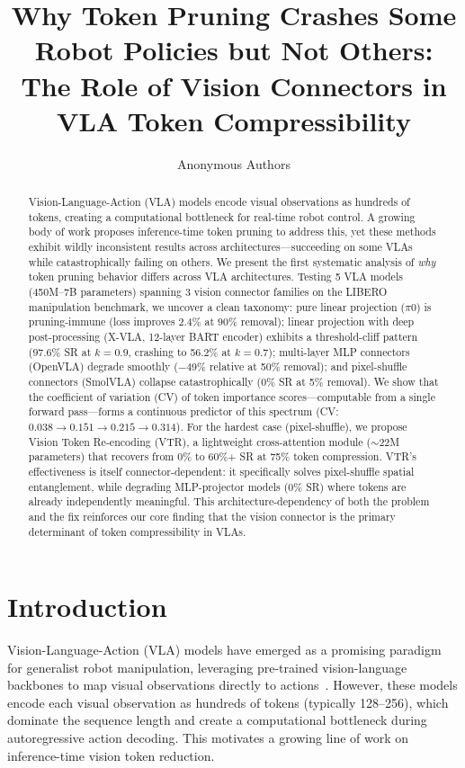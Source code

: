 \documentclass[letterpaper]{article}
\title{Why Token Pruning Crashes Some Robot Policies but Not Others:\\The Role of Vision Connectors in VLA Token Compressibility}
\author[1]{Anonymous Authors}
\affil[1]{Anonymous Institution}
\date{}
\begin{document}
\maketitle

\begin{abstract}
Vision-Language-Action (VLA) models encode visual observations as hundreds of tokens, creating a computational bottleneck for real-time robot control. A growing body of work proposes inference-time token pruning to address this, yet these methods exhibit wildly inconsistent results across architectures---succeeding on some VLAs while catastrophically failing on others. We present the first systematic analysis of \emph{why} token pruning behavior differs across VLA architectures. Testing 5 VLA models (450M--7B parameters) spanning 3 vision connector families on the LIBERO manipulation benchmark, we uncover a clean taxonomy: pure linear projection ($\pi$0) is pruning-immune (loss improves 2.4\% at 90\% removal); linear projection with deep post-processing (X-VLA, 12-layer BART encoder) exhibits a threshold-cliff pattern (97.6\% SR at $k{=}0.9$, crashing to 56.2\% at $k{=}0.7$); multi-layer MLP connectors (OpenVLA) degrade smoothly ($-$49\% relative at 50\% removal); and pixel-shuffle connectors (SmolVLA) collapse catastrophically (0\% SR at 5\% removal). We show that the coefficient of variation (CV) of token importance scores---computable from a single forward pass---forms a continuous predictor of this spectrum (CV: $0.038 \to 0.151 \to 0.215 \to 0.314$). For the hardest case (pixel-shuffle), we propose Vision Token Re-encoding (VTR), a lightweight cross-attention module ($\sim$22M parameters) that recovers from 0\% to 60\%+ SR at 75\% token compression. VTR's effectiveness is itself connector-dependent: it specifically solves pixel-shuffle spatial entanglement, while degrading MLP-projector models (0\% SR) where tokens are already independently meaningful. This architecture-dependency of both the problem and the fix reinforces our core finding that the vision connector is the primary determinant of token compressibility in VLAs.
\end{abstract}

\section{Introduction}

Vision-Language-Action (VLA) models have emerged as a promising paradigm for generalist robot manipulation, leveraging pre-trained vision-language backbones to map visual observations directly to actions~\cite{brohan2023rt2,kim2024openvla,black2024pi0}. However, these models encode each visual observation as hundreds of tokens (typically 128--256), which dominate the sequence length and create a computational bottleneck during autoregressive action decoding. This motivates a growing line of work on inference-time vision token reduction.
\end{document}
